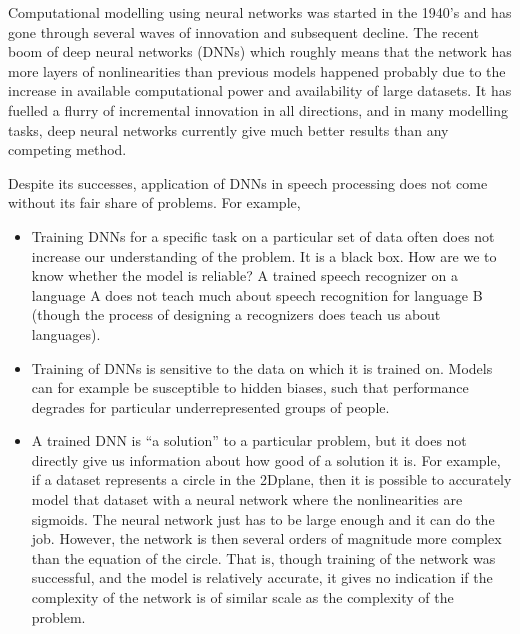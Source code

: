 \documentclass[letterpaper,10pt,english]{jupyterBook}
\begin{document}
\sphinxAtStartPar
Computational modelling using neural networks was started in the 1940’s
and has gone through several waves of innovation and subsequent decline.
The recent boom of deep neural networks (DNNs) \sphinxhyphen{} which roughly means
that the network has more layers of non\sphinxhyphen{}linearities than previous
models \sphinxhyphen{} happened probably due to the increase in available
computational power and availability of large data\sphinxhyphen{}sets. It has fuelled
a flurry of incremental innovation in all directions, and in many
modelling tasks, deep neural networks currently give much better results
than any competing method.

\sphinxAtStartPar
Despite its successes, application of DNNs in speech processing does not
come without its fair share of problems. For example,
\begin{itemize}
\item {} 
\sphinxAtStartPar
Training DNNs for a specific task on a particular set of data often
does not increase our understanding of the problem. It is a black
box. How are we to know whether the model is reliable? A trained
speech recognizer on a language A does not teach much about speech
recognition for language B (though the process of designing a
recognizers does teach us about languages).

\item {} 
\sphinxAtStartPar
Training of DNNs is sensitive to the data on which it is trained on.
Models can for example be susceptible to hidden biases, such that
performance degrades for particular under\sphinxhyphen{}represented groups of
people.

\item {} 
\sphinxAtStartPar
A trained DNN is “a solution” to a particular problem, but it does
not directly give us information about how good of a solution it is.
For example, if a data\sphinxhyphen{}set represents a circle in the 2D\sphinxhyphen{}plane, then
it is possible to accurately model that data\sphinxhyphen{}set with a neural
network where the non\sphinxhyphen{}linearities are sigmoids. The neural network
just has to be large enough and it can do the job. However, the
network is then several orders of magnitude more complex than the
equation of the circle. That is, though training of the network was
successful, and the model is relatively accurate, it gives no
indication if the complexity of the network is of similar scale as
the complexity of the problem.

\end{itemize}
\end{document}
